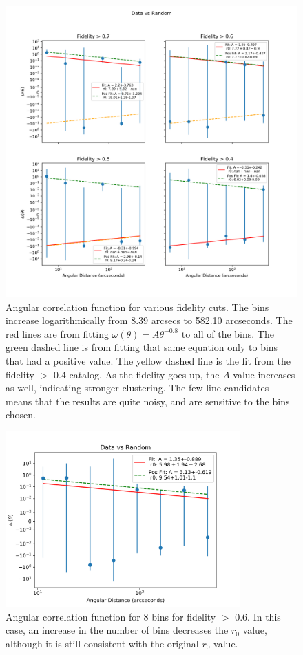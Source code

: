 \begin{figure}[tbp]
\centering \includegraphics[width=120mm]{clustering_two/Log_4Panel_Data_Vs_Random_bin6_NFalse_Num10000.png}
\caption{Angular correlation function for various fidelity cuts. The bins increase logarithmically from 8.39 arcsecs to 582.10 arcseconds. The red lines are from fitting $\omega(\theta) = A\theta^{-0.8} $ to all of the bins. The green dashed line is from fitting that same equation only to bins that had a positive value. The yellow dashed line is the fit from the fidelity $>$ 0.4 catalog. As the fidelity goes up, the $A$ value increases as well, indicating stronger clustering. The few line candidates means that the results are quite noisy, and are sensitive to the bins chosen.}
\label{fig:Angular_correlation}
\end{figure}

\begin{figure}[!tbp]
\centering \includegraphics[width=90mm]{clustering_two/Data_vs_Random_10000_bin8_sn0_6_NFalse.png}
\caption{Angular correlation function for 8 bins  for fidelity $>$ 0.6. In this case, an increase in the number of bins decreases the $r_0$ value, although it is still consistent with the original $r_0$ value.}
\label{fig:Angular_bin_8}
\end{figure}


